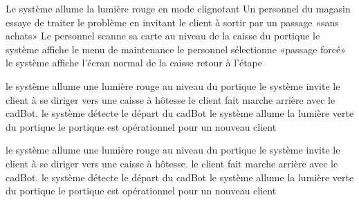   \etape Le système allume la lumière rouge en mode clignotant 
  \etape Un personnel du magasin essaye de traiter le problème en invitant le client à sortir par un passage «sans achats»
  \etape Le personnel scanne sa carte au niveau de la caisse du portique
  \etape le système affiche le menu de maintenance
  \etape le personnel sélectionne «passage forcé»
  \etape le système affiche l'écran normal de la caisse
  \etape retour à l'étape 
\stopcondition
\stopalternatif

\exception
{} 
  \etape le système allume une lumière rouge au niveau du portique
  \etape le système invite le client à se diriger vers une caisse à hôtesse
  \etape le client fait marche arrière avec le cadBot.
  \etape le système détecte le départ du cadBot
  \etape le système allume la lumière verte du portique
\stopcondition
\postcondition le portique est opérationnel pour un nouveau client
\stopalternatif

  \etape le système allume une lumière rouge au niveau du portique
  \etape le système invite le client à se diriger vers une caisse à hôtesse.
  \etape le client fait marche arrière avec le cadBot.
  \etape le système détecte le départ du cadBot
  \etape le système allume la lumière verte du portique
\stopcondition
\postcondition le portique est opérationnel pour un nouveau client
\stopalternatif


\stopCU
